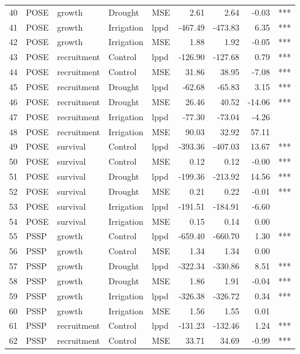 \begin{longtable}{rllllrrrl}
  40 & POSE & growth & Drought & MSE & 2.61 & 2.64 & -0.03 & *** \\ 
  41 & POSE & growth & Irrigation & lppd & -467.49 & -473.83 & 6.35 & *** \\ 
  42 & POSE & growth & Irrigation & MSE & 1.88 & 1.92 & -0.05 & *** \\ 
  43 & POSE & recruitment & Control & lppd & -126.90 & -127.68 & 0.79 & *** \\ 
  44 & POSE & recruitment & Control & MSE & 31.86 & 38.95 & -7.08 & *** \\ 
  45 & POSE & recruitment & Drought & lppd & -62.68 & -65.83 & 3.15 & *** \\ 
  46 & POSE & recruitment & Drought & MSE & 26.46 & 40.52 & -14.06 & *** \\ 
  47 & POSE & recruitment & Irrigation & lppd & -77.30 & -73.04 & -4.26 &  \\ 
  48 & POSE & recruitment & Irrigation & MSE & 90.03 & 32.92 & 57.11 &  \\ 
  49 & POSE & survival & Control & lppd & -393.36 & -407.03 & 13.67 & *** \\ 
  50 & POSE & survival & Control & MSE & 0.12 & 0.12 & -0.00 & *** \\ 
  51 & POSE & survival & Drought & lppd & -199.36 & -213.92 & 14.56 & *** \\ 
  52 & POSE & survival & Drought & MSE & 0.21 & 0.22 & -0.01 & *** \\ 
  53 & POSE & survival & Irrigation & lppd & -191.51 & -184.91 & -6.60 &  \\ 
  54 & POSE & survival & Irrigation & MSE & 0.15 & 0.14 & 0.00 &  \\ 
  55 & PSSP & growth & Control & lppd & -659.40 & -660.70 & 1.30 & *** \\ 
  56 & PSSP & growth & Control & MSE & 1.34 & 1.34 & 0.00 &  \\ 
  57 & PSSP & growth & Drought & lppd & -322.34 & -330.86 & 8.51 & *** \\ 
  58 & PSSP & growth & Drought & MSE & 1.86 & 1.91 & -0.04 & *** \\ 
  59 & PSSP & growth & Irrigation & lppd & -326.38 & -326.72 & 0.34 & *** \\ 
  60 & PSSP & growth & Irrigation & MSE & 1.56 & 1.55 & 0.01 &  \\ 
  61 & PSSP & recruitment & Control & lppd & -131.23 & -132.46 & 1.24 & *** \\ 
  62 & PSSP & recruitment & Control & MSE & 33.71 & 34.69 & -0.99 & *** \\ 

\end{longtable}
